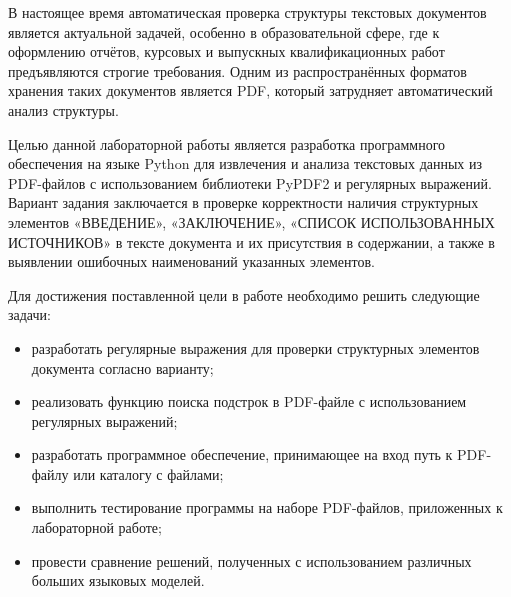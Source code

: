 
В настоящее время автоматическая проверка структуры текстовых документов является актуальной задачей,
особенно в образовательной сфере, где к оформлению отчётов, курсовых и выпускных квалификационных работ
предъявляются строгие требования. Одним из распространённых форматов хранения таких документов является PDF,
который затрудняет автоматический анализ структуры.

Целью данной лабораторной работы является разработка программного обеспечения на языке Python
для извлечения и анализа текстовых данных из PDF-файлов с использованием библиотеки PyPDF2 и регулярных выражений.
Вариант задания заключается в проверке корректности наличия структурных элементов
«ВВЕДЕНИЕ», «ЗАКЛЮЧЕНИЕ», «СПИСОК ИСПОЛЬЗОВАННЫХ ИСТОЧНИКОВ» в тексте документа и их присутствия в содержании,
а также в выявлении ошибочных наименований указанных элементов.

Для достижения поставленной цели в работе необходимо решить следующие задачи:
\begin{itemize}
    \item разработать регулярные выражения для проверки структурных элементов документа согласно варианту;
    \item реализовать функцию поиска подстрок в PDF-файле с использованием регулярных выражений;
    \item разработать программное обеспечение, принимающее на вход путь к PDF-файлу или каталогу с файлами;
    \item выполнить тестирование программы на наборе PDF-файлов, приложенных к лабораторной работе;
    \item провести сравнение решений, полученных с использованием различных больших языковых моделей.
\end{itemize}


